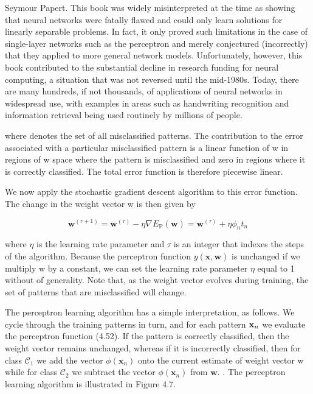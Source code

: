 \documentclass[
  10
]{article}
\begin{document}
Seymour Papert. This book was widely misinterpreted at the time as
showing that neural networks were fatally flawed and could only learn
solutions for linearly separable problems. In fact, it only proved such
limitations in the case of single-layer networks such as the perceptron
and merely conjectured (incorrectly) that they applied to more general
network models. Unfortunately, however, this book contributed to the
substantial decline in research funding for neural computing, a
situation that was not reversed until the mid-1980s. Today, there are
many hundreds, if not thousands, of applications of neural networks in
widespread use, with examples in areas such as handwriting recognition
and information retrieval being used routinely by millions of people.

where denotes the set of all misclassified patterns. The contribution to
the error associated with a particular misclassified pattern is a linear
function of w in regions of w space where the pattern is misclassified
and zero in regions where it is correctly classified. The total error
function is therefore piecewise linear.

We now apply the stochastic gradient descent algorithm to this error
function. The change in the weight vector w is then given by

\[
\mathbf {w} ^ {(\tau + 1)} = \mathbf {w} ^ {(\tau)} - \eta \nabla E _ {\mathrm{P}} (\mathbf {w}) = \mathbf {w} ^ {(\tau)} + \eta \phi_ {n} t _ {n}\tag{4.55}
\]

where \(\eta\) is the learning rate parameter and \(\tau\) is an integer
that indexes the steps of the algorithm. Because the perceptron function
\(y ( \mathbf { x } , \mathbf { w } )\) is unchanged if we multiply w by
a constant, we can set the learning rate parameter \(\eta\) equal to 1
without of generality. Note that, as the weight vector evolves during
training, the set of patterns that are misclassified will change.

The perceptron learning algorithm has a simple interpretation, as
follows. We cycle through the training patterns in turn, and for each
pattern \({ \bf x } _ { n }\) we evaluate the perceptron function
(4.52). If the pattern is correctly classified, then the weight vector
remains unchanged, whereas if it is incorrectly classified, then for
class \(\mathcal { C } _ { 1 }\) we add the vector
\(\phi (  { \mathbf { x } } _ { n } )\) onto the current estimate of
weight vector w while for class \(\mathcal { C } _ { 2 }\) we subtract
the vector \(\phi (  { \mathbf { x } } _ { n } )\) from
\(\mathbf { w } .\) . The perceptron learning algorithm is illustrated
in Figure 4.7.
\end{document}
